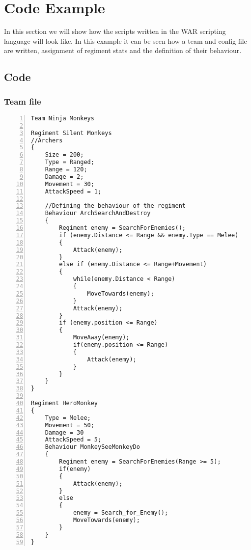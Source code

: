 \section{Code Example}
	In this section we will show how the scripts written in the WAR scripting language will look like.
	In this example it can be seen how a team and config file are written, assignment of regiment stats and the definition of their behaviour.
	\subsection{Code}
		\subsubsection{Team file}
					\begin{lstlisting}[basicstyle=\small\sffamily,
					keywords={break,case,const,continue,default,else,enum,
					for,if,return,switch,while,do,long,void,int,float,double,
					char,struct,typedef,include,size\_t},
					keywordstyle={\color{blue}},
					comment={[l]{//}}, morecomment={[s]{/*}{*/}}, commentstyle=\itshape,
					columns={[l]flexible}, numbers=left, numberstyle=\tiny,
					frameround=fftt, frame=shadowbox, captionpos=b,
					caption={Team file},
					label=LST:code31]
Team Ninja Monkeys

Regiment Silent Monkeys
//Archers
{
	Size = 200;
	Type = Ranged;
	Range = 120;
	Damage = 2;
	Movement = 30;
	AttackSpeed = 1;
	
	//Defining the behaviour of the regiment
	Behaviour ArchSearchAndDestroy
	{
		Regiment enemy = SearchForEnemies();
		if (enemy.Distance <= Range && enemy.Type == Melee)
		{
			Attack(enemy);
		}
		else if (enemy.Distance <= Range+Movement)
		{
			while(enemy.Distance < Range)
			{
				MoveTowards(enemy);
			}
			Attack(enemy);
		}
		if (enemy.position <= Range)
		{
			MoveAway(enemy);
			if(enemy.position <= Range)
			{
				Attack(enemy);
			}
		}
	}
}

Regiment HeroMonkey
{
	Type = Melee;
	Movement = 50;
	Damage = 30
	AttackSpeed = 5;
	Behaviour MonkeySeeMonkeyDo
	{
		Regiment enemy = SearchForEnemies(Range >= 5);
		if(enemy)
		{
			Attack(enemy);
		}
		else
		{
			enemy = Search_for_Enemy();
			MoveTowards(enemy);
		}
	}
}
					\end{lstlisting}
